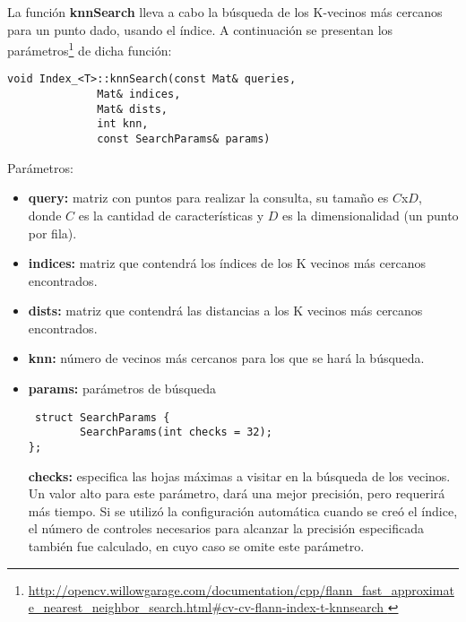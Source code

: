 \documentclass[a4paper,11pt,spanish]{article}
\begin{document}
La funci\'on \textbf{knnSearch} lleva a cabo la búsqueda de los K-vecinos más cercanos para un punto dado, usando el índice. A continuación se presentan los parámetros\footnote{\url{http://opencv.willowgarage.com/documentation/cpp/flann_fast_approximate_nearest_neighbor_search.html#cv-cv-flann-index-t-knnsearch } } 
de dicha función:
\begin{lstlisting}
void Index_<T>::knnSearch(const Mat& queries, 
			  Mat& indices, 
			  Mat& dists, 
			  int knn, 
			  const SearchParams& params)
\end{lstlisting}
Parámetros:
\begin{itemize}
  \item \textbf{query:} matriz con puntos para realizar la consulta, su tamaño es $C$x$D$, donde $C$ es la cantidad de caracter\'isticas y $D$ es la dimensionalidad (un punto por fila).
  \item \textbf{indices:} matriz que contendrá los índices de los K vecinos más cercanos encontrados.
  \item \textbf{dists:} matriz que contendrá las distancias a los K vecinos más cercanos encontrados.
  \item \textbf{knn:} número de vecinos más cercanos para los que se hará la búsqueda.
  \item \textbf{params:} parámetros de búsqueda
\begin{lstlisting}
 struct SearchParams {
        SearchParams(int checks = 32);
};
\end{lstlisting}
\textbf{checks:} especifica las hojas máximas a visitar en la búsqueda de los vecinos. Un valor alto para este parámetro, dará una mejor precisión, pero requerir\'a más tiempo. Si se utilizó la configuración automática cuando se creó el índice, el número de controles necesarios para alcanzar la precisión especificada también fue calculado, en cuyo caso se omite este parámetro.
\end{itemize}


\end{document}
